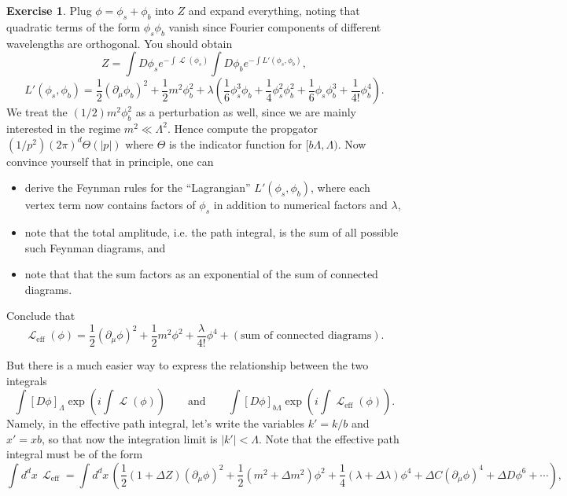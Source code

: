 \documentclass{report}
\theoremstyle{plain}
\theoremstyle{definition}
\newtheorem{exercise}{Exercise}[section]
\theoremstyle{remark}
\DeclareMathOperator{\cL}{\mathcal{L}}
\DeclareMathOperator{\eff}{eff}
\begin{document}
\begin{exercise}
  Plug $\phi = \phi_s + \phi_b$ into $Z$ and expand everything, noting
  that quadratic terms of the form $\phi_s\phi_b$ vanish since Fourier
  components of different wavelengths are orthogonal. You should obtain
  $$ Z = \int D\phi_s e^{-\int \cL(\phi_s)} \int D\phi_b e^{-\int L'(\phi_s, \phi_b)}, $$
  $$ L'(\phi_s, \phi_b) = \frac{1}{2} (\partial_\mu \phi_b)^2 + \frac{1}{2} m^2 \phi_b^2 + \lambda\left(\frac{1}{6} \phi_s^3\phi_b + \frac{1}{4} \phi_s^2\phi_b^2 + \frac{1}{6} \phi_s\phi_b^3 + \frac{1}{4!} \phi_b^4\right). $$
  We treat the $(1/2)m^2\phi_b^2$ as a perturbation as well, since we
  are mainly interested in the regime $m^2 \ll \Lambda^2$. Hence
  compute the propgator $(1/p^2)(2\pi)^d \Theta(|p|)$ where $\Theta$
  is the indicator function for $[b\Lambda, \Lambda)$. Now convince
  yourself that in principle, one can
  \begin{itemize}
  \item derive the Feynman rules for the ``Lagrangian''
    $L'(\phi_s, \phi_b)$, where each vertex term now contains factors
    of $\phi_s$ in addition to numerical factors and $\lambda$,
  \item note that the total amplitude, i.e. the path integral, is the
    sum of all possible such Feynman diagrams, and
  \item note that that the sum factors as an exponential of the sum of
    connected diagrams.
  \end{itemize}
  Conclude that
  $$ \cL_{\eff}(\phi) = \frac{1}{2}(\partial_\mu\phi)^2 + \frac{1}{2}m^2\phi^2 + \frac{\lambda}{4!}\phi^4 + (\text{sum of connected diagrams}). $$
\end{exercise}

But there is a much easier way to express the relationship between the
two integrals
$$ \int [D\phi]_\Lambda \exp(i\int \cL(\phi)) \qquad \text{and} \qquad \int [D\phi]_{b\Lambda} \exp(i\int \cL_{\eff}(\phi)). $$
Namely, in the effective path integral, let's write the variables
$k' = k/b$ and $x' = xb$, so that now the integration limit is
$|k'| < \Lambda$. Note that the effective path integral must be of the
form
$$ \int d^dx \, \cL_{\eff} = \int d^dx \, \left(\frac{1}{2} (1 + \Delta Z)(\partial_\mu \phi)^2 + \frac{1}{2}(m^2 + \Delta m^2)\phi^2 + \frac{1}{4}(\lambda + \Delta \lambda)\phi^4 + \Delta C(\partial_\mu \phi)^4 + \Delta D \phi^6 + \cdots\right), $$
\end{document}
